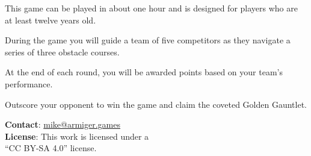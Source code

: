 \documentclass[a6paper, 11pt, parskip=half, DIV=15]{scrartcl}
\begin{document}
This game can be played in about one hour and is designed for players who are at least twelve years old.

During the game you will guide a team of five competitors as they navigate a series of three obstacle courses.

At the end of each round, you will be awarded points based on your team's performance.

Outscore your opponent to win the game and claim the coveted Golden Gauntlet.

\vfill

{
\hrulefill

\small
\textbf{Contact}: \href{mailto:mike@armiger.games}{mike@armiger.games}\\
\textbf{License}: This work is licensed under a\\``CC BY-SA 4.0'' license.%
}

\newpage
\end{document}
